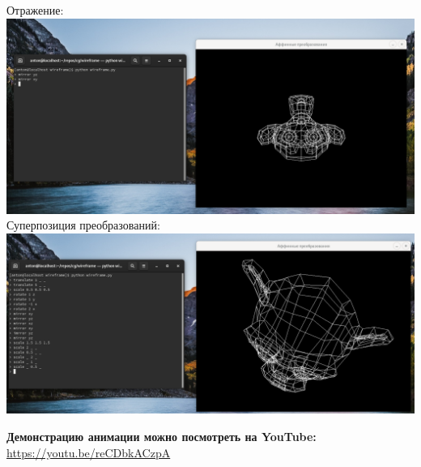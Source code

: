 \documentclass[a4paper,12pt]{article}
\begin{document}
\begin{flushleft}
  Отражение:
  \includegraphics{mirror.png}
  Суперпозиция преобразований:
  \includegraphics{all_transformations.png}
\end{flushleft}
\begin{flushleft}
  \textbf{Демонстрацию анимации можно посмотреть на YouTube:} \url{https://youtu.be/reCDbkACzpA}
\end{flushleft}
\end{document}

